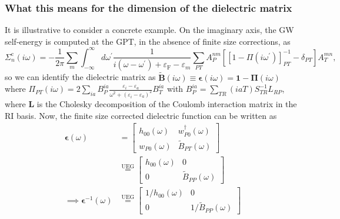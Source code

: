 \subsubsection{What this means for the dimension of the dielectric matrix}
It is illustrative to consider a concrete example. On the imaginary axis, the GW self-energy is computed at the GPT, in the absence of finite size corrections, as
\begin{equation}
\Sigma_n^{\mathrm{c}}(i \omega)= -\frac{1}{2 \pi} \sum_m \int_{-\infty}^{\infty} d \omega^{\prime} \frac{1}{i\left(\omega-\omega^{\prime}\right)+\varepsilon_{\mathrm{F}}-\varepsilon_m} \sum_{P T} A_P^{n m}\left[\left[1-\Pi\left(i \omega^{\prime}\right)\right]_{P T}^{-1}-\delta_{P T}\right] A_T^{m n},
\end{equation}
so we can identify the dielectric matrix as $\bm{\tilde{B}}(i\omega)\equiv\bm{\epsilon}(i \omega)=\bm{1}-\bm{\Pi}(i \omega)$ where $\Pi_{P T}(i \omega)=2 \sum_{i a} B_P^{i a} \frac{\varepsilon_i-\varepsilon_a}{\omega^2+\left(\varepsilon_i-\varepsilon_a\right)^2} B_T^{i a}$ with $B_P^{i a}=\sum_{T R}(i a T) S_{T R}^{-1} L_{R P}$, where $\mathbf{L}$ is the Cholesky decomposition of the Coulomb interaction matrix in the RI basis. Now, the finite size corrected dielectric function can be written as
\begin{align}
\bm{\epsilon}(\omega)
  &= \begin{bmatrix}
      h_{00}(\omega)        & w_{P0}^{\dagger}(\omega) \\
      w_{P0}(\omega)        & {\tilde{B}}_{PT}(\omega)
    \end{bmatrix} \\
&\overset{\text{UEG}}{=}
    \begin{bmatrix}
      h_{00}(\omega)        & 0 \\
      0        & {\tilde{B}}_{PP}(\omega) 
    \end{bmatrix} \\
\implies \bm{\epsilon}^{-1}(\omega)
  &\overset{\text{UEG}}{=} \begin{bmatrix}
      1/h_{00}(\omega)        & 0 \\
      0        & 1/{\tilde{B}}_{PP}(\omega) 
    \end{bmatrix}
\end{align}

